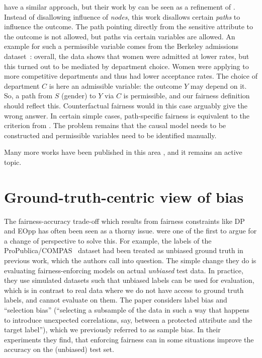 \citet{chiappa2019path} have a similar approach,
but their work by  can be seen as a refinement of \citet{kilbertus2017avoiding}.
Instead of disallowing influence of \emph{nodes}, this work disallows certain \emph{paths} to influence the outcome.
The path pointing directly from the sensitive attribute to the outcome is not allowed,
but paths via certain variables are allowed.
An example for such a permissible variable comes from the Berkeley admissions dataset~\citep{bickel1975sex}:
overall, the data shows that women were admitted at lower rates,
but this turned out to be mediated by department choice.
Women were applying to more competitive departments and thus had lower acceptance rates.
The choice of department \(C\) is here an admissible variable:
the outcome \(Y\) may depend on it.
So, a path from \(S\) (gender) to \(Y\) via \(C\) is permissible, and our fairness definition should reflect this.
Counterfactual fairness \citep{kusner2017counterfactual} would in this case arguably give the wrong answer.
In certain simple cases, path-specific fairness is equivalent to the criterion from \citet{kilbertus2017avoiding}.
The problem remains that the causal model needs to be constructed
and permissible variables need to be identified manually.

Many more works have been published in this area \citep[\eg,][]{wu2019pc,kilbertus2020sensitivity,creager2020causal},
and it remains an active topic.
%


\section{Ground-truth-centric view of bias}%
\label{sec:groundtruth-centric-view-of-bias}
The fairness-accuracy trade-off which results from fairness constraints like \ac{DP} and \ac{EOpp}
has often been seen as a thorny issue.
\citet{wick2019unlocking} were one of the first to argue for a change of perspective to solve this.
For example, the labels of the ProPublica/COMPAS~\citep{angwin2016machine} dataset had been treated as unbiased ground truth in previous work,
which the authors call into question.
The simple change they do is evaluating fairness-enforcing models on actual \emph{unbiased} test data.
In practice, they use simulated datasets such that unbiased labels can be used for evaluation,
which is in contrast to real data where we do not have access to ground truth labels,
and cannot evaluate on them.
The paper considers label bias and ``selection bias''
(``selecting a subsample of the data in such a way that happens to introduce unexpected correlations,
say, between a protected attribute and the target label''),
which we previously referred to as sample bias.
In their experiments they find,
that enforcing fairness can in some situations improve the accuracy on the (unbiased) test set.

